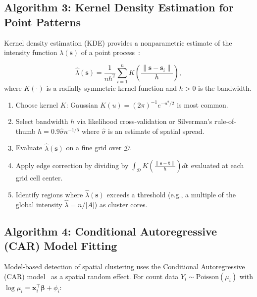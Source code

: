 \documentclass[conference]{IEEEtran}
\theoremstyle{definition}
\begin{document}
\subsection{Algorithm 3: Kernel Density Estimation for Point Patterns}

Kernel density estimation (KDE) provides a nonparametric estimate of the intensity function $\lambda(\mathbf{s})$ of a point process~\cite{silverman1986}:

\begin{equation}
\hat{\lambda}(\mathbf{s}) = \frac{1}{n h^2} \sum_{i=1}^{n} K\!\left(\frac{\|\mathbf{s} - \mathbf{s}_i\|}{h}\right),
\label{eq:kde}
\end{equation}
where $K(\cdot)$ is a radially symmetric kernel function and $h > 0$ is the bandwidth.

\begin{enumerate}
  \item Choose kernel $K$: Gaussian $K(u) = (2\pi)^{-1} e^{-u^2/2}$ is most common.
  \item Select bandwidth $h$ via likelihood cross-validation or Silverman's rule-of-thumb $h = 0.9 \hat{\sigma} n^{-1/5}$ where $\hat{\sigma}$ is an estimate of spatial spread.
  \item Evaluate $\hat{\lambda}(\mathbf{s})$ on a fine grid over $\mathcal{D}$.
  \item Apply edge correction by dividing by $\int_\mathcal{D} K\!\left(\frac{\|\mathbf{s} - \mathbf{t}\|}{h}\right)d\mathbf{t}$ evaluated at each grid cell center.
  \item Identify regions where $\hat{\lambda}(\mathbf{s})$ exceeds a threshold (e.g., a multiple of the global intensity $\hat{\lambda} = n/|A|$) as cluster cores.
\end{enumerate}

\subsection{Algorithm 4: Conditional Autoregressive (CAR) Model Fitting}

Model-based detection of spatial clustering uses the Conditional Autoregressive (CAR) model~\cite{besag1974} as a spatial random effect. For count data $Y_i \sim \text{Poisson}(\mu_i)$ with $\log \mu_i = \mathbf{x}_i^\top \boldsymbol{\beta} + \phi_i$:
\end{document}
